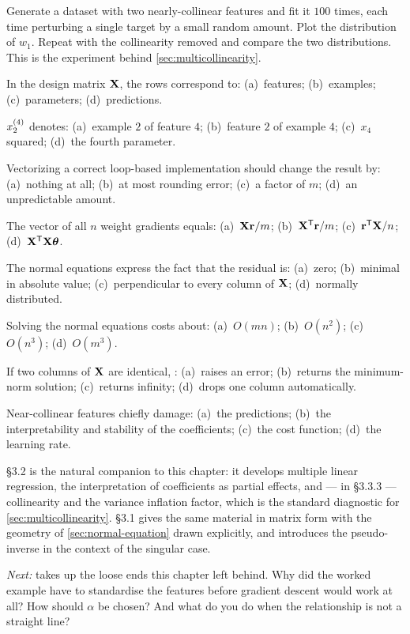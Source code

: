 \pe Generate a dataset with two nearly-collinear features and fit it $100$ times,
each time perturbing a single target by a small random amount. Plot the
distribution of $w_1$. Repeat with the collinearity removed and compare the two
distributions. This is the experiment behind \cref{sec:multicollinearity}.


\qz In the design matrix $\mathbf{X}$, the rows correspond to: (a)~features;
(b)~examples; (c)~parameters; (d)~predictions.

\qz $x^{(4)}_{2}$ denotes: (a)~example $2$ of feature $4$; (b)~feature $2$ of
example $4$; (c)~$x_4$ squared; (d)~the fourth parameter.

\qz Vectorizing a correct loop-based implementation should change the result by:
(a)~nothing at all; (b)~at most rounding error; (c)~a factor of $m$;
(d)~an unpredictable amount.

\qz The vector of all $n$ weight gradients equals: (a)~$\mathbf{X}\mathbf{r}/m$;
(b)~$\mathbf{X}^{\mathsf{T}}\mathbf{r}/m$; (c)~$\mathbf{r}^{\mathsf{T}}\mathbf{X}/n$;
(d)~$\mathbf{X}^{\mathsf{T}}\mathbf{X}\bm{\theta}$.

\qz The normal equations express the fact that the residual is: (a)~zero;
(b)~minimal in absolute value; (c)~perpendicular to every column of $\mathbf{X}$;
(d)~normally distributed.

\qz Solving the normal equations costs about: (a)~$O(mn)$; (b)~$O(n^2)$;
(c)~$O(n^3)$; (d)~$O(m^3)$.

\qz If two columns of $\mathbf{X}$ are identical, :
(a)~raises an error; (b)~returns the minimum-norm solution; (c)~returns
infinity; (d)~drops one column automatically.

\qz Near-collinear features chiefly damage: (a)~the predictions;
(b)~the interpretability and stability of the coefficients; (c)~the cost
function; (d)~the learning rate.

\furtherreading

\textcite{james2021} §3.2 is the natural companion to this chapter: it develops
multiple linear regression, the interpretation of coefficients as partial
effects, and --- in §3.3.3 --- collinearity and the variance inflation factor,
which is the standard diagnostic for \cref{sec:multicollinearity}.
\textcite{bishop2006} §3.1 gives the same material in matrix form with the
geometry of \cref{sec:normal-equation} drawn explicitly, and introduces the
pseudo-inverse in the context of the singular case.

\bigskip
\noindent\emph{Next:}  takes up the loose ends this chapter left
behind. Why did the worked example have to standardise the features before
gradient descent would work at all? How should $\alpha$ be chosen? And what do
you do when the relationship is not a straight line?
